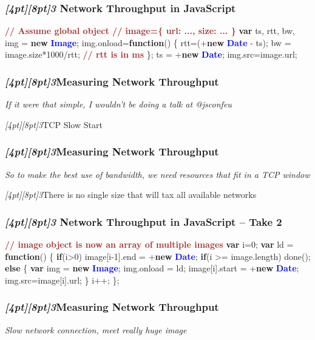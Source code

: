 \documentclass{beamer}
\newcommand{\sn}[1]{\textrm{\textit{\Huge{\raisebox{-3pt}[4pt][8pt]{\textcolor{f2elblue}{#1}}}}}\hspace{4pt}}
\newcommand{\innersplash}[1]{
  \begin{center}
    \large \textrm{\textit{ #1 } }
  \end{center}
}
\newcommand{\splashslide}[2][{}]{
  \begin{frame}
  \frametitle{#1}
  \innersplash{#2}
  \end{frame}
}
\def\brown<#1>#2{\textcolor<#1>{brown}{\textbf<#1>{#2}}}
\def\green<#1>#2{\textcolor<#1>{dark-green}{\textbf<#1>{#2}}}
\def\blue<#1>#2{\textcolor<#1>{blue}{\textbf<#1>{#2}}}
\begin{document}
\begin{frame}[fragile]
\frametitle{\sn{3} Network Throughput in JavaScript}
\begin{semiverbatim}
\brown<1>{// Assume global object
// image=\{ url: ..., size: ... \}}
\green<1>{var} ts, rtt, bw, img = \green<1>{new} \blue<1>{Image};
img.onload=\green<1>{function}() \{
   rtt=(+\green<1>{new} \blue<1>{Date} - ts);
   bw = image.size*1000/rtt;    \brown<1>{// rtt is in ms}
\};
ts = +\green<1>{new} \blue<1>{Date};
img.src=image.url;
\end{semiverbatim}
\end{frame}

\splashslide[\sn{3}Measuring Network Throughput]{If it were that simple, I wouldn't be doing a talk at @jsconfeu}

\begin{frame}{\sn{3}TCP Slow Start}
\end{frame}

\splashslide[\sn{3}Measuring Network Throughput]{So to make the best use of bandwidth, we need resources that fit in a TCP window}

\begin{frame}{\sn{3}There is no single size that will tax all available networks }
\end{frame}

\begin{frame}[fragile]
\frametitle{\sn{3} Network Throughput in JavaScript -- Take 2}
\begin{semiverbatim}
\brown<1>{// image object is now an array of multiple images}
\green<1>{var} i=0;
\green<1>{var} ld = \green<1>{function}() \{
   \green<1>{if}(i>0)
      image[i-1].end = +\green<1>{new} \blue<1>{Date};
   \green<1>{if}(i >= image.length)
      done();
   \green<1>{else} \{
      \green<1>{var} img = \green<1>{new} \blue<1>{Image};
      img.onload = ld;
      image[i].start = +\green<1>{new} \blue<1>{Date};
      img.src=image[i].url;
   \}
   i++;
\};
\end{semiverbatim}
\end{frame}

\splashslide[\sn{3}Measuring Network Throughput]{Slow network connection, meet really huge image}
\end{document}
